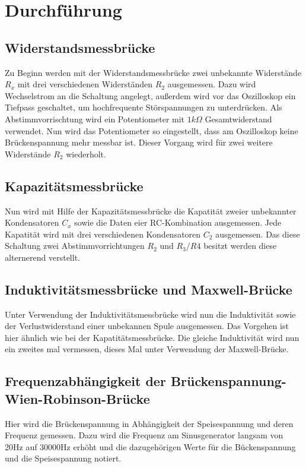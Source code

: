 \section{Durchführung}
\subsection{Widerstandsmessbrücke}
Zu Beginn werden mit der Widerstandsmessbrücke zwei unbekannte Widerstände $R_{x}$ mit
drei verschiedenen Widerständen $R_{2}$ ausgemessen.
Dazu wird Wechselstrom an die Schaltung angelegt, außerdem wird vor das Oszilloskop
ein Tiefpass geschaltet, um hochfrequente Störspannungen zu unterdrücken.
Als Abstimmvorrischtung wird ein Potentiometer mit $1k\Omega$ Gesamtwiderstand
verwendet. Nun wird das Potentiometer so eingestellt, dass am Oszilloskop
keine Brückenspannung mehr messbar ist. Dieser Vorgang wird für zwei weitere
Widerstände $R_{2}$ wiederholt.

\subsection{Kapazitätsmessbrücke}
Nun wird mit Hilfe der Kapazitätsmessbrücke die Kapatität zweier unbekannter
Kondensatoren $C_{x}$ sowie die Daten eier RC-Kombination ausgemessen. Jede Kapatität
wird mit drei verschiedenen Kondensatoren $C_{2}$ ausgemessen.
Das diese Schaltung zwei Abstimmvorrichtungen $R_{2}$ und $R_{3}/R{4}$ besitzt werden diese
alternerend verstellt.

\subsection{Induktivitätsmessbrücke und Maxwell-Brücke}
Unter Verwendung der Induktivitätsmessbrücke wird nun die Induktivität sowie
der Verlustwiderstand einer unbekannen Spule ausgemessen. Das Vorgehen ist hier
ähnlich wie bei der Kapatitätsmessbrücke.
Die gleiche Induktivität wird nun ein zweites mal vermessen, dieses Mal unter
Verwendung der Maxwell-Brücke.

\subsection{Frequenzabhängigkeit der Brückenspannung-Wien-Robinson-Brücke}
Hier wird die Brückenspannung in Abhängigkeit der Speisespannung und deren Frequenz gemessen.
Dazu wird die Frequenz am Sinusgenerator langsam von 20Hz auf 30\:000Hz erhöht und
die dazugehörigen Werte für die Bückenspannung und die Speisespannung notiert.





\label{sec:Durchführung}
